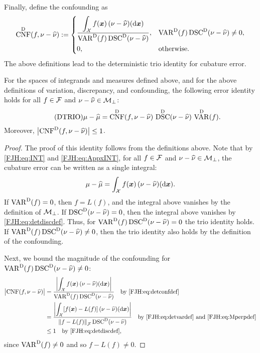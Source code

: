 \documentclass[graybox,footinfo]{svmult}
\DeclareMathOperator{\algn}{CNF}
\DeclareMathOperator{\disc}{DSC}
\DeclareMathOperator{\Var}{VAR}
\begin{document}
Finally, define the confounding as 
	\begin{equation} \label{FJH:eq:detconfdef}
\algn^\Dt(f,\nu - \hnu): =  \begin{cases} \displaystyle 
\frac{\displaystyle\int_{\calX} f(\bsx) \, (\nu - \hnu)(\D 
	\bsx)}{\Var^\Dt(f)\disc^\Dt(\nu - \hnu)},  & 
\Var^\Dt(f)\disc^\Dt(\nu - \hnu) \ne 0, \\[2ex]
0, & \text{otherwise}.
\end{cases}
\end{equation}
The above definitions lead to the deterministic trio identity for cubature 
error.

\begin{theorem}  \label{FJH:thm:dtrio} For the spaces 
of integrands and 
measures defined above, and for the above definitions of variation, discrepancy, and 
confounding, the following error identity holds for all $f \in {\mathcal{F}}$ and $\nu - \widehat{\nu}  \in 
{\mathcal{M}}_\bot$: 
\begin{equation} \tag{DTRIO} \label{FJH:eq:dtrio}
\mu - \hmu  = \algn^\Dt(f,\nu - \hnu) \, \disc^\Dt(\nu - \hnu) \, \Var^{\Dt}(f).
\end{equation}
Moreover, $\abs{\algn^\Dt(f,\nu - \hnu)} \le 1$. 
\end{theorem}
\begin{proof}  The proof of this identity follows from the definitions above.  Note that by 
\eqref{FJH:eq:INT} and \eqref{FJH:eq:AppxINT}, for all $f \in {\mathcal{F}}$ and $\nu - \widehat{\nu}  \in 
{\mathcal{M}}_\bot$, the cubature 
error 
can be written as a 
single integral:
	\begin{equation} \label{FJH:eq:err_as_int}
	\mu - \hmu   =  \int_{\calX} f(\bsx) \, (\nu - \hnu)(\D \bsx).
	\end{equation}
	If $\Var^{\Dt}(f) = 0$, then $f = L(f)$, and the integral above vanishes by the 
	definition of ${\mathcal{M}}_{\bot}$.  If $\disc^\Dt(\nu - \hnu) = 0$, then the integral above 
	vanishes by \eqref{FJH:eq:detdiscdef}.  Thus, for $\Var^{\Dt}(f) \disc^\Dt(\nu - \hnu) = 
	0$ 
	the trio identity holds. If $\Var^{\Dt}(f) \disc^\Dt(\nu - \hnu) \ne 0$, then the trio 
	identity also holds by the definition of the confounding.
	
	Next, we bound the magnitude of the confounding for $\Var^{\Dt}(f) \disc^\Dt(\nu - 
	\hnu) \ne 0$: 
	\begin{align*}
	\abs{\algn(f,\nu - \hnu)} & = 
		\frac{\biggl \lvert\displaystyle\int_{\calX} f(\bsx) \, (\nu - \hnu)(\D 
			\bsx) \biggr \rvert}{\Var^\Dt(f)\disc^\Dt(\nu - \hnu)} \quad \text{by 
			\eqref{FJH:eq:detconfdef}}\\
		& = \frac{\biggl \lvert\displaystyle\int_{\calX} [f(\bsx) - L(f)] \, (\nu - \hnu)(\D 
			\bsx) \biggr \rvert}{\norm{f-L(f)}_{\calF}\disc^\Dt(\nu - \hnu)} \quad \text{by 
			\eqref{FJH:eq:detvardef} and \eqref{FJH:eq:Mperpdef}} \\
		& \le 1 \quad \text{by \eqref{FJH:eq:detdiscdef}},
\end{align*}
since $\Var^{\Dt}(f) \ne 0$ and so $f - L(f) \ne 0$.
\end{proof}
\end{document}
